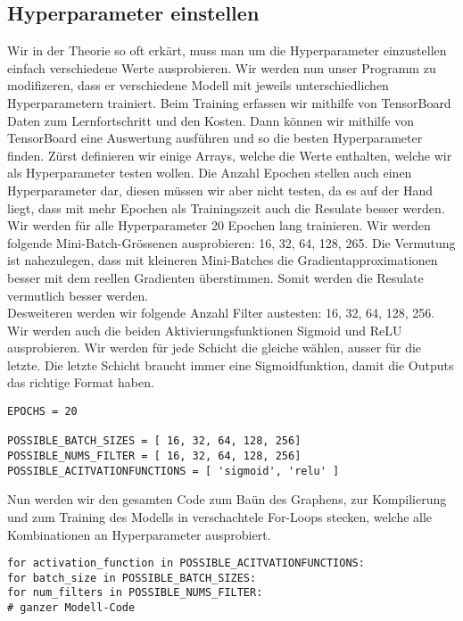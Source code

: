 \subsection{Hyperparameter einstellen}
Wir in der Theorie so oft erkärt, muss man um die Hyperparameter einzustellen
einfach verschiedene Werte ausprobieren. Wir werden nun unser Programm zu
modifizeren, dass er verschiedene Modell mit jeweils unterschiedlichen
Hyperparametern trainiert. Beim Training erfassen wir mithilfe von TensorBoard
Daten zum Lernfortschritt und den Kosten. Dann können wir mithilfe von
TensorBoard eine Auswertung ausführen und so die besten Hyperparameter finden.
\para{}
Zürst definieren wir einige Arrays, welche die Werte enthalten, welche wir als
Hyperparameter testen wollen. Die Anzahl Epochen stellen auch einen
Hyperparameter dar, diesen müssen wir aber nicht testen, da es auf der Hand
liegt, dass mit mehr Epochen als Trainingszeit auch die Resulate besser werden.
Wir werden für alle Hyperparameter 20 Epochen lang trainieren.
\para{}
Wir werden folgende Mini-Batch-Grössenen ausprobieren: 16, 32, 64, 128, 265.
Die Vermutung ist nahezulegen, dass mit kleineren Mini-Batches die
Gradientapproximationen besser mit dem reellen Gradienten überstimmen. Somit
werden die Resulate vermutlich besser werden. \\
Desweiteren werden wir folgende Anzahl Filter austesten: 16, 32, 64, 128, 256.
Wir werden auch die beiden Aktivierungsfunktionen Sigmoid und ReLU ausprobieren.
Wir werden für jede Schicht die gleiche wählen, ausser für die letzte. Die
letzte Schicht braucht immer eine Sigmoidfunktion, damit die Outputs das
richtige Format haben.

\begin{verbatim}
EPOCHS = 20

POSSIBLE_BATCH_SIZES = [ 16, 32, 64, 128, 256]
POSSIBLE_NUMS_FILTER = [ 16, 32, 64, 128, 256]
POSSIBLE_ACITVATIONFUNCTIONS = [ 'sigmoid', 'relu' ]
\end{verbatim}
Nun werden wir den gesamten Code zum Baün des Graphens, zur Kompilierung und
zum Training des Modells in verschachtele For-Loops stecken, welche alle
Kombinationen an Hyperparameter ausprobiert.

\begin{verbatim}
for activation_function in POSSIBLE_ACITVATIONFUNCTIONS:
for batch_size in POSSIBLE_BATCH_SIZES:
for num_filters in POSSIBLE_NUMS_FILTER:
# ganzer Modell-Code
\end{verbatim}

